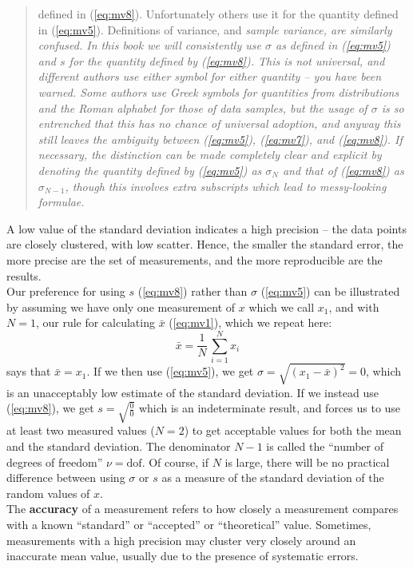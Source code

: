 \documentclass[12pt]{article}
\begin{document}
\begin{quote}
   defined in (\ref{eq:mv8}).
Unfortunately others use it for the quantity defined in (\ref{eq:mv5}).
Definitions of variance, and \it sample variance, \rm are similarly confused.
In this book we will consistently use $\sigma$ as defined in  (\ref{eq:mv5}) and $s$ for
   the quantity defined by  (\ref{eq:mv8}).
This is not universal, and different authors use either symbol for either quantity -- you have been warned.
Some authors use Greek symbols for quantities from distributions and the Roman alphabet  for those of data samples, but the usage of $\sigma$ is  so entrenched that this has no chance  of universal adoption, and anyway this still leaves the ambiguity between (\ref{eq:mv5}), (\ref{eq:mv7}),
   and (\ref{eq:mv8}). 
If necessary, the distinction can be made completely clear and explicit by denoting the quantity defined by (\ref{eq:mv5}) as $\sigma_N$ and that of (\ref{eq:mv8}) as $\sigma_{N-1}$, though this involves extra subscripts which lead to messy-looking formulae.
\end{quote} 
A low value of the standard deviation indicates a high precision -- the data points are closely clustered, with low scatter. Hence, the smaller the standard error, the more precise are the set of measurements, and the more reproducible are the results.\\

\noindent Our preference for using $s$ (\ref{eq:mv8}) rather than $\sigma$ (\ref{eq:mv5}) can be illustrated by
   assuming we have only one measurement of $x$ which we call $x_1$, and with $N=1$, our rule for calculating
   $\bar{x}$ (\ref{eq:mv1}), which we repeat here:
\begin{equation}  
  \bar{x} = \frac{1}{N}\,\sum_{i = 1}^N x_i
\end{equation}
   says that $\bar{x} = x_1$.
If we then use    (\ref{eq:mv5}), we get $\sigma = \sqrt{ (x_1 - \bar{x})^2} = 0$, which is an unacceptably
   low estimate of the standard deviation.
If we instead use (\ref{eq:mv8}), we get $s = \sqrt{\frac{0}{0}}$ which is an indeterminate result, and forces us
  to use at least two measured values ($N=2$) to get acceptable values for both the mean and the standard
  deviation.
The denominator $N-1$ is called the ``number of degrees of freedom'' $\nu = \text{dof}$.
Of course, if $N$ is large, there will be no practical difference between using $\sigma$ or $s$ as a measure
  of the standard deviation of the random values of $x$.\\
  
\noindent The \textbf{accuracy} of a measurement refers to how closely a measurement compares
  with a known ``standard'' or ``accepted'' or ``theoretical'' value.
Sometimes, measurements with a high precision may cluster very closely around an inaccurate
     mean value, usually due to the presence of   systematic errors.\\
   
\end{document}
